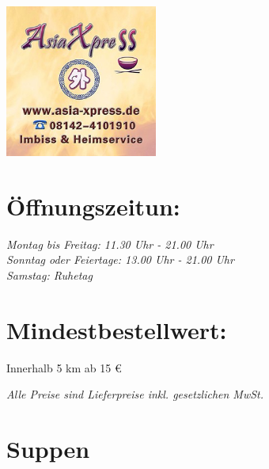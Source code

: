 \documentclass[12pt,nofoldmark,notumble]{leaflet}
\begin{document}


\begin{center}
  \includegraphics[height=5cm,keepaspectratio]{logo.png}%
\end{center}

\section{Öffnungszeitun:}
  \small\emph{Montag bis Freitag:  11.30 Uhr - 21.00 Uhr} \\
  \small\emph{Sonntag oder Feiertage:  13.00 Uhr - 21.00 Uhr} \\
  \small\emph{Samstag:  Ruhetag }



\section{Mindestbestellwert:}
Innerhalb 5 km ab 15 €

\begin{center}
  \small\emph{Alle Preise sind Lieferpreise inkl. gesetzlichen MwSt.}
\end{center}

\section{Suppen}
\end{document}
